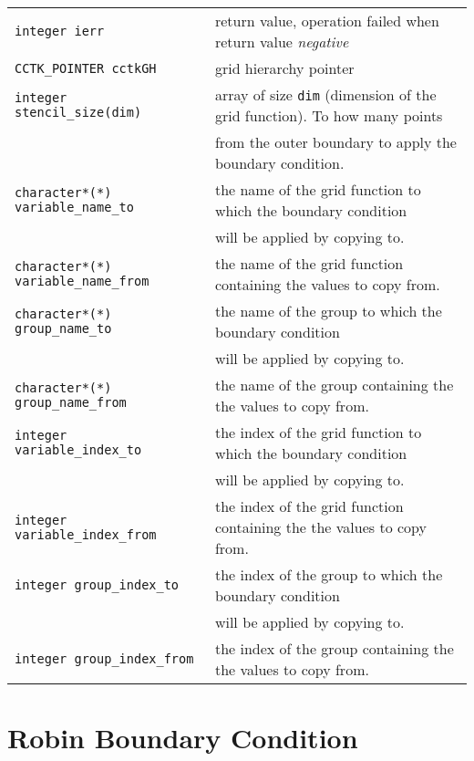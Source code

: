 \documentclass{article}
\begin{document}
\begin{tabular}{ll}
{\tt integer ierr} & return value, operation failed when return
value {\em negative}\\
{\tt CCTK\_POINTER cctkGH} & grid hierarchy pointer\\
{\tt integer stencil\_size(dim)} & array of size {\tt dim} (dimension of the grid function).  To how many points \\
& from the outer boundary to apply the boundary condition. \\

{\tt character*(*) variable\_name\_to} & the name of the grid function
	to which the boundary condition\\
& will be applied by copying to.\\
{\tt character*(*) variable\_name\_from} & the name of the grid function
    containing the values to copy from.\\

{\tt character*(*) group\_name\_to} & the name of the group
	to which the boundary condition\\
& will be applied by copying to.\\
{\tt character*(*) group\_name\_from} & the name of the group
    containing the the values to copy from.\\

{\tt integer variable\_index\_to} & the index of the grid function
	to which the boundary condition\\
& will be applied by copying to.\\
{\tt integer variable\_index\_from} & the index of the grid function
    containing the the values to copy from.\\

{\tt integer group\_index\_to} & the index of the group
	to which the boundary condition\\
& will be applied by copying to.\\
{\tt integer group\_index\_from} & the index of the group
    containing the the values to copy from.
\end{tabular}


\section{Robin Boundary Condition}
\end{document}
